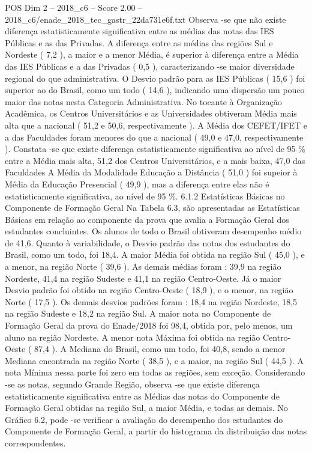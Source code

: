 \begin{textsample}{POS Dim 2 – 2018\_c6 – Score 2.00 – 2018\_c6/enade\_2018\_tec\_gastr\_22da731e6f.txt}
Observa -se que não existe diferença estatisticamente significativa entre as médias das notas das IES Públicas e as das Privadas.
A diferença entre as médias das regiões Sul e Nordeste ( 7,2 ), a maior e a menor Média, é superior à diferença entre a Média das IES Públicas e a das Privadas ( 0,5 ), caracterizando -se maior diversidade regional do que administrativa.
O Desvio padrão para as IES Públicas ( 15,6 ) foi superior ao do Brasil, como um todo ( 14,6 ), indicando uma dispersão um pouco maior das notas nesta Categoria Administrativa.
No tocante à Organização Acadêmica, os Centros Universitários e as Universidades obtiveram Média mais alta que a nacional ( 51,2 e 50,6, respectivamente ).
A Média dos CEFET/IFET e a das Faculdades foram menores do que a nacional ( 49,0 e 47,0, respectivamente ).
Constata -se que existe diferença estatisticamente significativa ao nível de 95 \% entre a Média mais alta, 51,2 dos Centros Universitários, e a mais baixa, 47,0 das Faculdades A Média da Modalidade Educação a Distância ( 51,0 ) foi supeior à Média da Educação Presencial ( 49,9 ), mas a diferença entre elas não é estatisticamente significativa, ao nível de 95 \%. 6.1.2 Estatísticas Básicas no Componente de Formação Geral Na Tabela 6.3, são apresentadas as Estatísticas Básicas em relação ao componente da prova que avalia a Formação Geral dos estudantes concluintes.
Os alunos de todo o Brasil obtiveram desempenho médio de 41,6.
Quanto à variabilidade, o Desvio padrão das notas dos estudantes do Brasil, como um todo, foi 18,4.
A maior Média foi obtida na região Sul ( 45,0 ), e a menor, na região Norte ( 39,6 ).
As demais médias foram : 39,9 na região Nordeste, 41,4 na região Sudeste e 41,1 na região Centro-Oeste.
Já o maior Desvio padrão foi obtido na região Centro-Oeste ( 18,9 ), e o menor, na região Norte ( 17,5 ).
Os demais desvios padrões foram : 18,4 na região Nordeste, 18,5 na região Sudeste e 18,2 na região Sul.
A maior nota no Componente de Formação Geral da prova do Enade/2018 foi 98,4, obtida por, pelo menos, um aluno na região Nordeste.
A menor nota Máxima foi obtida na região Centro-Oeste ( 87,4 ).
A Mediana do Brasil, como um todo, foi 40,8, sendo a menor Mediana encontrada na região Norte ( 38,5 ), e a maior, na região Sul ( 44,5 ).
A nota Mínima nessa parte foi zero em todas as regiões, sem exceção.
Considerando -se as notas, segundo Grande Região, observa -se que existe diferença estatisticamente significativa entre as Médias das notas do Componente de Formação Geral obtidas na região Sul, a maior Média, e todas as demais.
No Gráfico 6.2, pode -se verificar a avaliação do desempenho dos estudantes do Componente de Formação Geral, a partir do histograma da distribuição das notas correspondentes.

\end{textsample}
